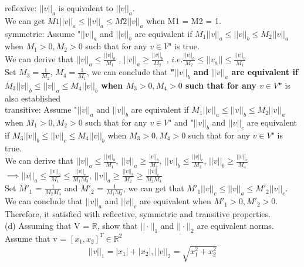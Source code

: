\documentclass{article}
\begin{document}
reflexive: 	$||v||_{a}$ is equivalent to $||v||_{a}$. \\We can get $M1||v||_{a} \leq ||v||_{a} \leq M2||v||_{a}$ when M1 = M2 = 1.\\

symmetric: Assume "$||v||_{a}$ and $||v||_{b}$ are equivalent if $M_1||v||_{a} \leq ||v||_{b} \leq M_2 ||v||_{a}$ when $M_1>0, M_2 >0$ such that for any $v \in V$" is true.\\

We can derive that $||v||_a \leq \frac{||v||_b}{M_1}$ , $||v||_{a} \geq \frac{||v||_b}{M_2}$
, $i.e. \frac{||v||_b}{M_2}\leq||v_a|| \leq \frac{||v||_b}{M_1}$ \\
Set $M_3 = \frac{1}{M_2}$, $M_4 = \frac{1}{M_1}$, we can conclude that
\textbf{"$||v||_{b}$ and $||v||_{a}$ are equivalent if $M_3||v||_{b} \leq ||v||_{a} \leq M_4 ||v||_{b}$ when $M_3>0, M_4 >0$ such that for any $v \in V$"} is also established\\

transitive: Assume "$||v||_{a}$ and $||v||_{b}$ are equivalent if $M_1||v||_{a} \leq ||v||_{b} \leq M_2 ||v||_{a}$ when $M_1>0, M_2 >0$ such that for any $v \in V$" and "$||v||_{b}$ and $||v||_{c}$ are equivalent if $M_3||v||_{b} \leq ||v||_{c} \leq M_4 ||v||_{b}$   when $M_3>0, M_4 >0$ such that for any $v \in V$" is true.\\

We can derive that $||v||_a \leq \frac{||v||_b}{M_1}$, $||v||_a \geq \frac{|v||_b}{M_2}$, $||v||_b \leq \frac{||v||_c}{M_3}$, $||v||_b \geq \frac{||v||_c}{M_4}$ \\

$\implies ||v||_a \leq \frac{||v||_b}{M_1} \leq \frac{||v||_c}{M_1 M_3}$, $||v||_a \geq \frac{||v||_b}{M_2} \geq \frac{||v||_c}{M_2 M_4}$  \\
Set $M'_{1}$ = $\frac{1}{M_2M_4}$ and $M'_{2}$ = $\frac{1}{M_1M_3}$, we can get that $M'_{1}||v||_c \leq ||v||_a \leq M'_{2} ||v||_c $. We can conclude that $||v||_a$ and $||v||_c$ are equivalent when $M'_1>0, M'_2 >0$. \\

Therefore, it satisfied with reflective, symmetric and transitive properties.\\

(d) Assuming that V =  $\mathbb{R}$, show that $||\cdot||_1$ and $||\cdot||_2$ are equivalent norms.\\
Assume that v = $[x_1,x_2]^T \in \mathbb{R}^2$\\
\begin{gather}
||v||_1 = |x_1| + |x_2|, ||v||_2 = \sqrt{x_1^2 + x_2^2}
\end{gather}
\end{document}

